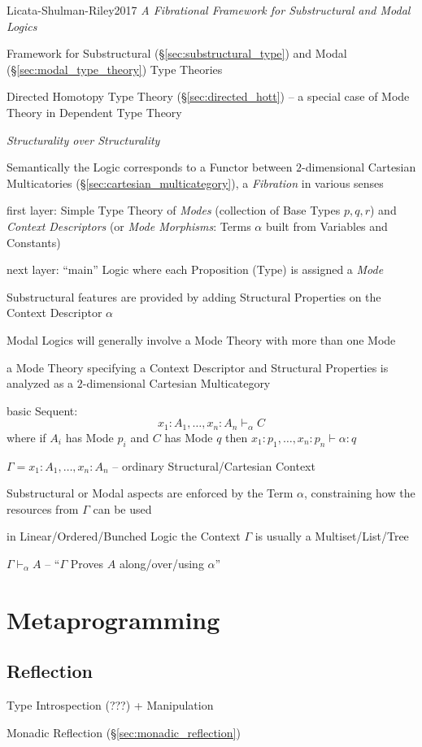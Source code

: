 Licata-Shulman-Riley2017 \emph{A Fibrational Framework for
  Substructural and Modal Logics}

Framework for Substructural (\S\ref{sec:substructural_type}) and Modal
(\S\ref{sec:modal_type_theory}) Type Theories

\fist Directed Homotopy Type Theory (\S\ref{sec:directed_hott}) --
a special case of Mode Theory in Dependent Type Theory

\emph{Structurality over Structurality}

Semantically the Logic corresponds to a Functor between
$2$-dimensional Cartesian Multicatories
(\S\ref{sec:cartesian_multicategory}), a \emph{Fibration} in various
senses

first layer: Simple Type Theory of \emph{Modes} (collection of Base
Types $p,q,r$) and \emph{Context Descriptors} (or \emph{Mode
  Morphisms}: Terms $\alpha$ built from Variables and Constants)

next layer: ``main'' Logic where each Proposition (Type) is assigned a
\emph{Mode}

Substructural features are provided by adding Structural Properties on
the Context Descriptor $\alpha$

Modal Logics will generally involve a Mode Theory with more than one
Mode

a Mode Theory specifying a Context Descriptor and Structural
Properties is analyzed as a $2$-dimensional Cartesian Multicategory

basic Sequent:
\[
  x_1:A_1,\ldots,x_n:A_n \vdash_\alpha C
\]
where if $A_i$ has Mode $p_i$ and $C$ has Mode $q$ then
$x_1:p_1,\ldots,x_n:p_n \vdash \alpha:q$

$\Gamma = x_1:A_1,\ldots,x_n:A_n$ -- ordinary Structural/Cartesian
Context

Substructural or Modal aspects are enforced by the Term $\alpha$,
constraining how the resources from $\Gamma$ can be used

in Linear/Ordered/Bunched Logic the Context $\Gamma$ is usually a
Multiset/List/Tree

$\Gamma \vdash_\alpha A$ -- ``$\Gamma$ Proves $A$ along/over/using
$\alpha$''



\section{Metaprogramming}\label{sec:metaprogramming}

\subsection{Reflection}\label{sec:type_reflection}

Type Introspection (???) + Manipulation

Monadic Reflection (\S\ref{sec:monadic_reflection})
